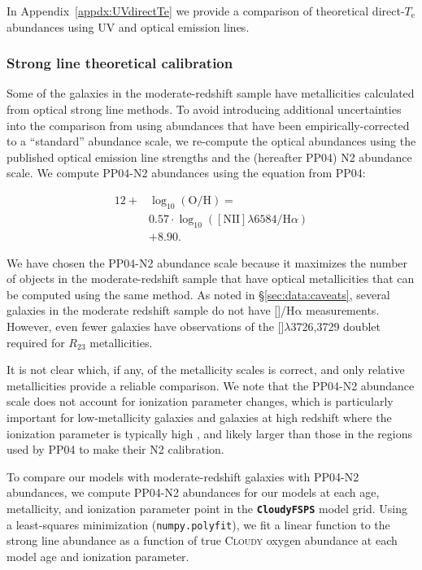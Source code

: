 \documentclass[trackchanges, preprint2]{aastex62}
\newcommand{\CloudyFSPS}{{\tt \textbf{CloudyFSPS}}\xspace}
\newcommand{\Cloudy}{\textsc{Cloudy}\xspace}
\newcommand{\hii}{\ion{H}{2}}
\newcommand{\nii}{[\ion{N}{2}]}
\newcommand{\oii}{[\ion{O}{2}]}
\newcommand{\ha}{\ensuremath{\mathrm{H\alpha}}\xspace}
\newcommand{\logten}{\ensuremath{\log_{10}}}
\newcommand{\logOH}{\ensuremath{\logten (\mathrm{O}/\mathrm{H})}\xspace}
\newcommand{\Te}{\ensuremath{T_{\mathrm{e}}}\xspace}
\begin{document}
In Appendix~\ref{appdx:UVdirectTe} we provide a comparison of theoretical direct-\Te abundances using UV and optical emission lines.

\subsubsection{Strong line theoretical calibration}\label{sec:Z:corr:strong}

Some of the galaxies in the moderate-redshift sample have metallicities calculated from optical strong line methods. To avoid introducing additional uncertainties into the comparison from using abundances that have been empirically-corrected to a ``standard'' abundance scale, we re-compute the optical abundances using the published optical emission line strengths and the \citet{Pettini+2004} (hereafter PP04) N2 abundance scale. We compute PP04-N2 abundances using the equation from PP04:

\begin{equation}\label{eq:O3N2}
\begin{aligned}
12 +& \logOH = \\
& 0.57 \cdot \log_{10}([\mathrm{NII}]\lambda6584/\mathrm{H}\alpha)\\
& + 8.90.
\end{aligned}
\end{equation}

We have chosen the PP04-N2 abundance scale because it maximizes the number of objects in the moderate-redshift sample that have optical metallicities that can be computed using the same method. As noted in \S\ref{sec:data:caveats}, several galaxies in the moderate redshift sample do not have \nii{}/\ha{} measurements. However, even fewer galaxies have observations of the \oii{}$\lambda$3726,3729 doublet required for $R_{23}$ metallicities. 

It is not clear which, if any, of the metallicity scales is correct, and only relative metallicities provide a reliable comparison. We note that the PP04-N2 abundance scale does not account for ionization parameter changes, which is particularly important for low-metallicity galaxies and galaxies at high redshift where the ionization parameter is typically high \citep[e.g.,][]{Kewley+2013a, Kewley+2013b, Masters+2014, Sanders+2016, Bian+2017, Strom+2017}, and likely larger than those in the \hii{} regions used by PP04 to make their N2 calibration.

To compare our models with moderate-redshift galaxies with PP04-N2 abundances, we compute PP04-N2 abundances for our models at each age, metallicity, and ionization parameter point in the \CloudyFSPS model grid. Using a least-squares minimization ({\tt numpy.polyfit}), we fit a linear function to the strong line abundance as a function of true \Cloudy oxygen abundance at each model age and ionization parameter. 
\end{document}

